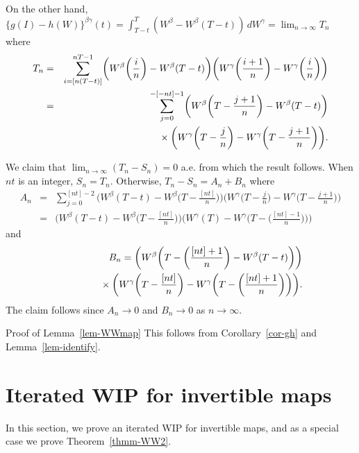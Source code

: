 \documentclass[aop,MSNbibl,seceqn,dvips]{arximspdf}
\begin{document}
\begin{pf}
On the other hand,
$\{g(I)-h(W)\}^{\beta\gamma}(t) = \int_{T-t}^T (W^\beta-W^\beta(T-t))
\,dW^\gamma=\lim_{n\to\infty} T_n$ where
%
\begin{eqnarray*}
T_n & =&\sum_{i=[n(T-t)]}^{nT-1}
\biggl(W^\beta\biggl({\frac
{i}{n}}\biggr)-W^\beta(T-t)
\biggr) \biggl(W^\gamma\biggl({\frac{i+1}{n}}\biggr)-W^\gamma
\biggl({\frac{i}{n}}\biggr) \biggr)
\\
& =&\sum_{j=0}^{-[-nt]-1} \biggl(W^\beta
\biggl(T-{\frac{j+1}{n}}\biggr)-W^\beta (T-t) \biggr)\\
&&\hspace*{46pt}{}\times
\biggl(W^\gamma\biggl(T-{\frac{j}{n}}\biggr)-W^\gamma
\biggl(T-{\frac
{j+1}{n}}\biggr) \biggr).
\end{eqnarray*}

We claim that $\lim_{n\to\infty}(T_n-S_n)=0$ a.e. from which the
result follows.
When $nt$ is an integer, $S_n=T_n$. Otherwise,
$T_n-S_n= A_n+B_n$ where
%
\begin{eqnarray*}
A_n & =&\sum_{j=0}^{[nt]-2}
\biggl(W^\beta(T-t)-W^\beta\biggl(T-{\frac
{[nt]}{n}}
\biggr) \biggr) \biggl(W^\gamma\biggl(T-{\frac{j}{n}}
\biggr)-W^\gamma\biggl(T-{\frac
{j+1}{n}}\biggr) \biggr)
\\
& = &\biggl(W^\beta(T-t)-W^\beta\biggl(T-{\frac{[nt]}{n}}
\biggr) \biggr) \biggl(W^\gamma(T)-W^\gamma\biggl(T-\biggl({
\frac{[nt]-1}{n}}\biggr) \biggr)\biggr)
\end{eqnarray*}
%
and
%
\begin{eqnarray*}
&&B_n= \biggl(W^\beta\biggl(T-\biggl({\frac{[nt]+1}{n}}
\biggr)-W^\beta(T-t) \biggr)\biggr)\\
&&\hspace*{33pt}{}\times \biggl(W^\gamma\biggl(T-{
\frac{[nt]}{n}}\biggr)-W^\gamma\biggl(T-\biggl({\frac
{[nt]+1}{n}}
\biggr) \biggr)\biggr).
\end{eqnarray*}
%
The claim follows since $A_n\to0$ and $B_n\to0$ as $n\to\infty$.
\end{pf}

\begin{pf*}{Proof of Lemma~\ref{lem-WWmap}}
This follows from Corollary~\ref{cor-gh} and Lemma~\ref{lem-identify}.
\end{pf*}

\section{Iterated WIP for invertible maps}
\label{sec-NUH}

In this section, we prove an iterated WIP for invertible maps, and as a
special case we prove Theorem~\ref{thmm-WW2}.
\end{document}
